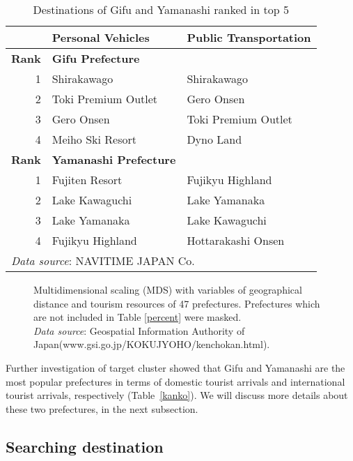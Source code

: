 \documentclass[10pt, conference, compsocconf]{IEEEtran}
\begin{document}
 \begin{table}[!h]\caption{Destinations of Gifu and Yamanashi ranked in top 5}
\label{dest}
\centering
\begin{tabular}{rll}
\hline
 & \bf Personal Vehicles& \bf Public Transportation \\ \hline
\bf Rank & \bf Gifu Prefecture \\\hline
1 & Shirakawago & Shirakawago \\
2 & Toki Premium Outlet & Gero Onsen \\
3 & Gero Onsen & Toki Premium Outlet \\
4 & Meiho Ski Resort & Dyno Land \\
\bf  Rank & \bf Yamanashi Prefecture \\\hline
1 & Fujiten Resort & Fujikyu Highland \\
2 & Lake Kawaguchi & Lake Yamanaka \\
3 & Lake Yamanaka & Lake Kawaguchi \\
4 & Fujikyu Highland & Hottarakashi Onsen\\
\hline
\multicolumn{3}{l}{{\it Data source}: NAVITIME JAPAN Co.}
\end{tabular}
\end{table}

\begin{figure*}[!t]
\centering
{}
\qquad
{}
\caption{Multidimensional scaling (MDS) with variables of geographical distance and tourism resources of 47 prefectures. Prefectures which are not included in Table \ref{percent} were masked.
\\{\it Data source}: Geospatial Information Authority of Japan(www.gsi.go.jp/KOKUJYOHO/kenchokan.html).}\label{multi}
\end{figure*}




Further investigation of target cluster showed that Gifu and Yamanashi are the most popular  prefectures in terms of domestic tourist arrivals and international tourist arrivals, respectively (Table~\ref{kanko}).
We will discuss more details about these two prefectures, in the next subsection.


\subsection{Searching destination}
\end{document}
